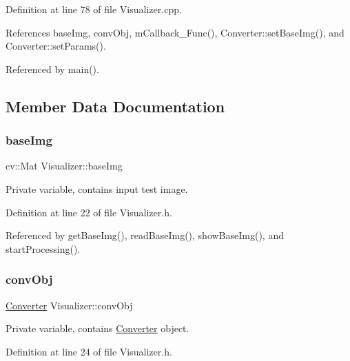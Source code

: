 Definition at line 78 of file Visualizer.\+cpp.



References base\+Img, conv\+Obj, m\+Callback\+\_\+\+Func(), Converter\+::set\+Base\+Img(), and Converter\+::set\+Params().



Referenced by main().



\subsection{Member Data Documentation}
\mbox{\label{class_visualizer_a5e171a5b9a1998982fac95f07cacd610}} 
\subsubsection{\texorpdfstring{baseImg}{baseImg}}
{\footnotesize\ttfamily cv\+::\+Mat Visualizer\+::base\+Img\hspace{0.3cm}{\ttfamily [private]}}



Private variable, contains input test image. 



Definition at line 22 of file Visualizer.\+h.



Referenced by get\+Base\+Img(), read\+Base\+Img(), show\+Base\+Img(), and start\+Processing().

\mbox{\label{class_visualizer_a0b885971fbf27caee743c7f5e9c18566}} 
\subsubsection{\texorpdfstring{convObj}{convObj}}
{\footnotesize\ttfamily \mbox{\hyperlink{class_converter}{Converter}} Visualizer\+::conv\+Obj\hspace{0.3cm}{\ttfamily [private]}}



Private variable, contains \mbox{\hyperlink{class_converter}{Converter}} object. 



Definition at line 24 of file Visualizer.\+h.



